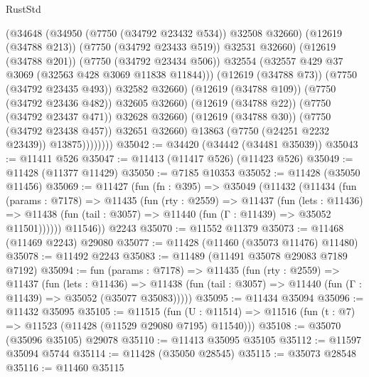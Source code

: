 \begin{lexlean}{RustStd}
\begin{coremodule}
                              (@34648
                                (@34950 (@7750 (@34792 @23432 @534)) @32508 @32660)
                                (@12619 (@34788 @213))
                                (@7750 (@34792 @23433 @519))
                                @32531
                                @32660)
                              (@12619 (@34788 @201))
                              (@7750 (@34792 @23434 @506))
                              @32554
                              (@32557 @429 @37 @3069 (@32563 @428 @3069 @11838 @11844)))
                            (@12619 (@34788 @73))
                            (@7750 (@34792 @23435 @493))
                            @32582
                            @32660)
                          (@12619 (@34788 @109))
                          (@7750 (@34792 @23436 @482))
                          @32605
                          @32660)
                        (@12619 (@34788 @22))
                        (@7750 (@34792 @23437 @471))
                        @32628
                        @32660)
                      (@12619 (@34788 @30))
                      (@7750 (@34792 @23438 @457))
                      @32651
                      @32660)
                    @13863
                    (@7750 (@24251 @2232 @23439))
                    @13875))))))))
@35042 := @34420 (@34442 (@34481 @35039))
@35043 := @11411 @526
@35047 := @11413 (@11417 @526) (@11423 @526)
@35049 := @11428 (@11377 @11429)
@35050 := @7185 @10353
@35052 := @11428 (@35050 @11456)
@35069 := @11427
    (fun (fn : @395) =>
    @35049
      (@11432
        (@11434
          (fun (params : @7178) =>
          @11435
            (fun (rty : @2559) =>
            @11437
              (fun (lets : @11436) =>
              @11438 (fun (tail : @3057) => @11440 (fun (Γ : @11439) => @35052 @11501))))))
        @11546))
    @2243
@35070 := @11552 @11379
@35073 := @11468 (@11469 @2243) @29080
@35077 := @11428 (@11460 (@35073 @11476) @11480)
@35078 := @11492 @2243
@35083 := @11489 (@11491 @35078 @29083 @7189 @7192)
@35094 := fun (params : @7178) =>
  @11435
    (fun (rty : @2559) =>
    @11437
      (fun (lets : @11436) =>
      @11438 (fun (tail : @3057) => @11440 (fun (Γ : @11439) => @35052 (@35077 @35083)))))
@35095 := @11434 @35094
@35096 := @11432 @35095
@35105 := @11515
    (fun (U : @11514) => @11516 (fun (t : @7) => @11523 (@11428 (@11529 @29080 @7195) @11540)))
@35108 := @35070 (@35096 @35105) @29078
@35110 := @11413 @35095 @35105
@35112 := @11597 @35094 @5744
@35114 := @11428 (@35050 @28545)
@35115 := @35073 @28548
@35116 := @11460 @35115

\end{coremodule}
\end{lexlean}
